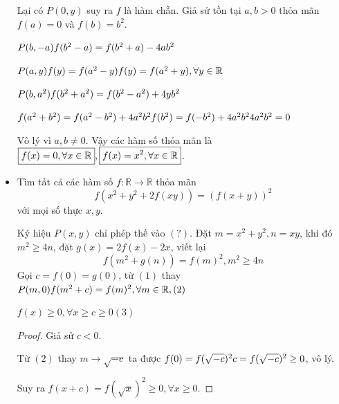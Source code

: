 \documentclass[11pt]{scrartcl}
\begin{document}
\begin{itemize}[label=, leftmargin=0em, itemsep=0.5em]
\begin{sol}
        Lại có $P(0,y)$ suy ra $f$ là hàm chẵn. Giả sử tồn tại $a,b > 0$ thỏa mãn $f(a) = 0$ và $f(b) = b^2$.

        $P(b,-a) \ra f(b^2 - a) = f(b^2 + a) -4ab^2$

        $P(a,y) \ra f(y) = f(a^2 - y) \ra f(y) = f(a^2 + y),\yr$ 

        $P(b,a^2) \ra f(b^2 + a^2) = f(b^2 - a^2) +4yb^2$ 
        
        $\lra f(a^2 + b^2) = f(a^2 - b^2) + 4a^2b^2 \lra f(b^2) = f(-b^2) + 4a^2b^2 \lra 4a^2b^2 = 0 $ 

        Vô lý vì $a, b \neq 0$. Vậy các hàm số thỏa mãn là $\boxed{f(x) = 0 ,\forall x\in \mathbb{R}}, \boxed{f(x) = x^2 ,\forall x\in \mathbb{R}}$.
    \end{sol}
    

    \item \begin{bt}
        Tìm tất cả các hàm số $f: \mathbb{R} \to \mathbb{R}$ thỏa mãn
        \[
           f(x^2 + y^2 +2f(xy)) = \left(f(x + y)\right)^2
        \]
        với mọi số thực $x,y$.
    \end{bt}
    \begin{sol}
        Ký hiệu $P(x,y)$ chỉ phép thế vào $(?)$. Đặt $m = x^2 + y^2, n = xy$, khi đó $m^2 \geq 4n$, đặt $g(x) = 2f(x) - 2x$, viết lại 
        \[
            f(m^2 +g(n)) = f(m)^2, m^2 \geq 4n\tag{1}
        \]
        Gọi $c = f(0) = g(0)$, từ $(1)$ thay $P(m,0) \ra f(m^2 + c) =f(m)^2, \forall m \in \bb{R}, (2)$ 

        $f(x) \geq 0,\forall x \geq c \geq 0 (3)$
        
        \begin{proof}
        Giả sử $c < 0$.
        
        Từ $(2)$ thay $m \to \sqrt{-c}$ ta được  $f(0) = f(\sqrt{-c})^2 \lra c = f(\sqrt{-c})^2 \geq 0$, vô lý.

        Suy ra $f(x + c) = f(\sqrt{x})^2 \geq 0, \forall x \geq 0$.
        \end{proof}
        


\end{sol}
\end{itemize}
\end{document}
